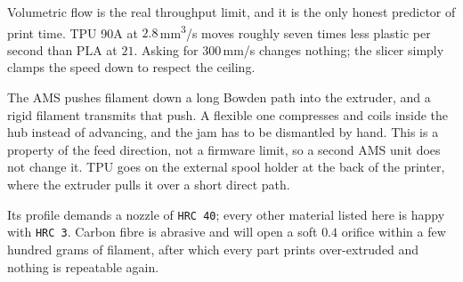  Volumetric flow is the
real throughput limit, and it is the only honest predictor of print time. TPU
90A at $2.8$\,mm\textsuperscript{3}/s moves roughly seven times less plastic per
second than PLA at $21$. Asking for 300\,mm/s changes nothing; the slicer simply
clamps the speed down to respect the ceiling.


 The AMS pushes filament down a long
Bowden path into the extruder, and a rigid filament transmits that push. A
flexible one compresses and coils inside the hub instead of advancing, and the
jam has to be dismantled by hand. This is a property of the feed direction, not
a firmware limit, so a second AMS unit does not change it. TPU goes on the
external spool holder at the back of the printer, where the extruder pulls it
over a short direct path.


 Its profile demands a nozzle of
\texttt{HRC 40}; every other material listed here is happy with \texttt{HRC 3}.
Carbon fibre is abrasive and will open a soft $0.4$ orifice within a few hundred
grams of filament, after which every part prints over-extruded and nothing is
repeatable again.

